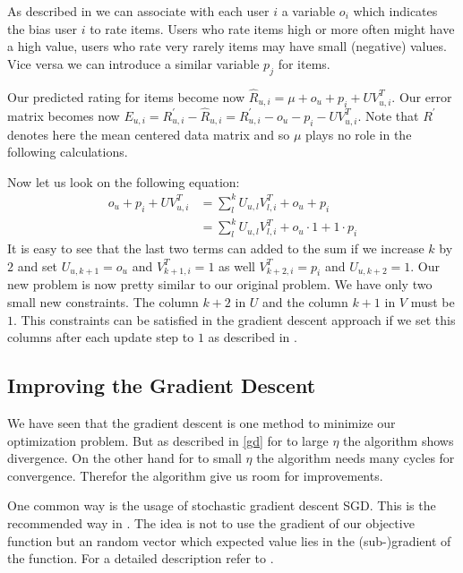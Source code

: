 \documentclass[DIV=14,twocolumn]{scrartcl}
\begin{document}
As described in \cite{Ag16} we can associate with each user $i$ a variable $o_i$ which indicates the bias user $i$ to rate items. Users who rate items high or more often might have a high value, users who rate very rarely items may have small (negative) values. Vice versa we can introduce a similar variable $p_j$ for items.
 
Our predicted rating for items become now $\hat{R}_{u,i} = \mu + o_u + p_i + UV^T_{u,i}$. Our error matrix becomes now $E_{u,i} = R_{u,i}^{'} - \hat{R}_{u,i} = R_{u,i}^{'} - o_u - p_i - UV^T_{u,i}$. Note that $R^{'}$ denotes here the mean centered data matrix and so $\mu$ plays no role in the following calculations.

Now let us look on the following equation:
\begin{equation*}
\begin{split}
o_u + p_i + UV^T_{u,i} &= \sum_{l}^{k}U_{u,l}V^T_{l,i} + o_u + p_i\\ &= \sum_{l}^{k}U_{u,l}V^T_{l,i} + o_u\cdot 1 + 1\cdot p_i
\end{split}
\end{equation*}
It is easy to see that the last two terms can added to the sum if we increase $k$ by $2$ and set $U_{u,k+1}=o_u$ and $V^T_{k+1,i}=1$ as well $V^T_{k+2,i}=p_i$ and $U_{u,k+2}=1$. Our new problem is now pretty similar to our original problem. We have only two small new constraints. The column $k+2$ in $U$ and the column $k+1$ in $V$ must be $1$.
This constraints can be satisfied in the gradient descent approach if we set this columns after each update step to $1$ as described in \cite{Ag16}.

\subsection{Improving the Gradient Descent}
We have seen that the gradient descent is one method to minimize our optimization problem. But as described in \ref{gd} for to large $\eta$ the algorithm shows divergence.
On the other hand for to small $\eta$ the algorithm needs many cycles for convergence. Therefor the algorithm give us room for improvements.

One common way is the usage of stochastic gradient descent SGD. This is the recommended way in \cite{KoBeVo09}. The idea is not to use the gradient of our objective function but an random vector which expected value lies in the (sub-)gradient of the function. For a detailed description refer to \cite{ShSh14}.
\end{document}

